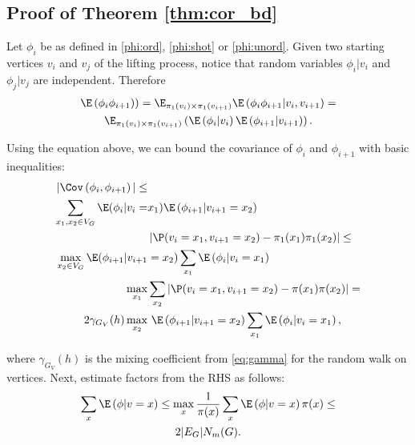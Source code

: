 \subsection{Proof of Theorem \ref{thm:cor_bd}}

Let $\phi_i$ be as defined in \eqref{phi:ord}, \eqref{phi:shot} or \eqref{phi:unord}.
Given two starting vertices $v_i$ and $v_j$ of the lifting process, notice that random variables $\phi_i|v_i$ and $\phi_j|v_j$ are independent.
Therefore
\begin{multline*}
    \E\left(\phi_i \phi_{i+1})\right)=
    \E_{\pi_1(v_i)\times \pi_1(v_{i+1})} \E\left(\phi_i \phi_{i+1}| v_i, v_{i+1}\right) =\\
     \E_{\pi_1(v_i)\times \pi_1(v_{i+1})} \left(\E\left(\phi_i|v_i\right) \E\left(\phi_{i+1}|v_{i+1}\right)\right).
\end{multline*}

Using the equation above, we can bound the covariance of $\phi_i$ and $\phi_{i+1}$ with basic inequalities:
\begin{align*}
    |\Cov\left(\phi_i, \phi_{i+1}\right)| \leq & \\
    \sum_{x_1,x_2\in V_G}  \E(\phi_i|v_i = & x_1)  \E\left(\phi_{i+1}|v_{i+1}=x_2\right)\\
    &\left\vert \P(v_i=x_1,v_{i+1}=x_2) - \pi_1(x_1)\pi_1(x_2)\right\vert\leq \\
    \max_{x_2\in V_G}  \E(\phi_{i+1}|v_{i+1} & =x_2) \sum_{x_1} \E\left(\phi_i|v_i = x_1\right)\\
    \max_{x_1} & \sum_{x_2}  \left\vert \P(v_i=x_1,v_{i+1}=x_2) - \pi(x_1)\pi(x_2)\right\vert = \\
      2\gamma_{G_V}(h) \max_{x_2} &\ \E\left(\phi_{i+1}|v_{i+1}=x_2\right) \sum_{x_1} \E\left(\phi_i|v_i = x_1\right),
\end{align*}

where $\gamma_{G_V}(h)$ is the mixing coefficient from \eqref{eq:gamma} for the random walk on vertices.
Next, estimate factors from the RHS as follows:
\begin{multline}
    \sum_{x}\E\left(\phi|v = x\right) \leq
    \max_{x}\frac{1}{\pi(x)} \sum_{x}\E\left(\phi|v = x\right) \pi(x)\leq \\
    2|E_G| N_m(G).
\end{multline}


